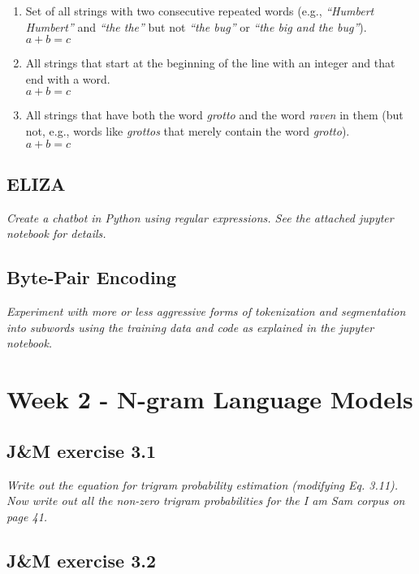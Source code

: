 \documentclass[a4paper, 11pt]{article}
\begin{document}
\begin{enumerate}
	\item Set of all strings with two consecutive repeated words (e.g., \textit{“Humbert Humbert”} and \textit{“the the”} but not \textit{“the bug”} or \textit{“the big and the bug”}). \\ $a + b = c$
	
	\item All strings that start at the beginning of the line with an integer and that end with a word. \\ $a + b = c$
	
	\item All strings that have both the word \textit{grotto} and the word \textit{raven} in them (but not, e.g., words like \textit{grottos} that merely contain the word \textit{grotto}). \\ $a + b = c$
\end{enumerate}

\subsection{ELIZA}

\textit{Create a chatbot in Python using regular expressions. See the attached jupyter notebook for details.}

\subsection{Byte-Pair Encoding}

\textit{Experiment with more or less aggressive forms of tokenization and segmentation into subwords using the training data and code as explained in the jupyter notebook.}

\section{Week 2 - N-gram Language Models}

\subsection{J\&M exercise 3.1}

\textit{Write out the equation for trigram probability estimation (modifying Eq. 3.11). Now write out all the non-zero trigram probabilities for the I am Sam corpus on page 41.}

\subsection{J\&M exercise 3.2}
\end{document}
